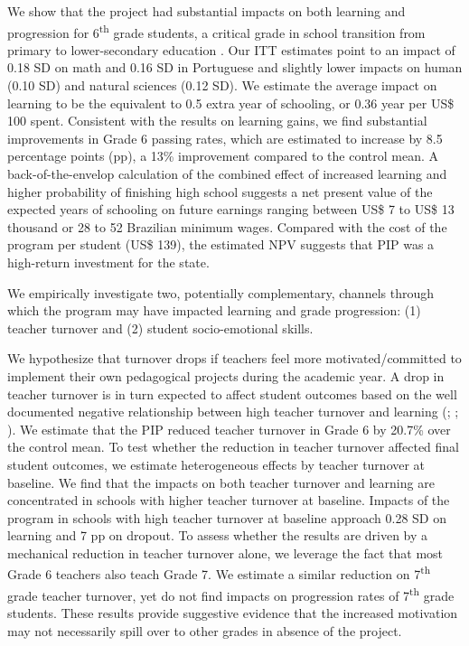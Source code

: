 \documentclass[11pt,a4paper]{article}
\begin{document}
We show that the project had substantial impacts on both learning and progression for 6\textsuperscript{th} grade students, a critical grade in school transition from primary to lower-secondary education \citep{Santos2017}. Our ITT estimates point to an impact of 0.18 SD on math and 0.16 SD in Portuguese and slightly lower impacts on human (0.10 SD) and natural sciences (0.12 SD). We estimate the average impact on learning to be the equivalent to 0.5 extra year of schooling, or 0.36 year per US\$ 100 spent. Consistent with the results on learning gains, we find substantial improvements in Grade 6 passing rates, which are estimated to increase by 8.5 percentage points (pp), a 13\% improvement compared to the control mean. A back-of-the-envelop calculation of the combined effect of increased learning and higher probability of finishing high school suggests a net present value of the expected years of schooling on future earnings ranging between US\$ 7 to US\$ 13 thousand or 28 to 52 Brazilian minimum wages. Compared with the cost of the program per student (US\$ 139), the estimated NPV suggests that PIP was a high-return investment for the state.


We empirically investigate two, potentially complementary, channels through which the program may have impacted learning and grade progression: (1) teacher turnover and (2) student socio-emotional skills. 


We hypothesize that turnover drops if teachers feel more motivated/committed to implement their own pedagogical projects during the academic year. A drop in teacher turnover is in turn expected to affect student outcomes based on the well documented negative relationship between high teacher turnover and learning (\citealp{akhtari2018political}; \citealp{ronfeldt2013teacher}; \citealp{jackson2014teacher}). We estimate that the PIP reduced teacher turnover in Grade 6 by 20.7\% over the control mean. To test whether the reduction in teacher turnover affected final student outcomes, we estimate heterogeneous effects by teacher turnover at baseline. We find that the impacts on both teacher turnover and learning are concentrated in schools with higher teacher turnover at baseline. Impacts of the program in schools with high teacher turnover at baseline approach 0.28 SD on learning and 7 pp on dropout. To assess whether the results are driven by a mechanical reduction in teacher turnover alone, we leverage the fact that most Grade 6 teachers also teach Grade 7. We estimate a similar reduction on 7\textsuperscript{th} grade teacher turnover, yet do not find impacts on progression rates of 7\textsuperscript{th} grade students. These results provide suggestive evidence that the increased motivation may not necessarily spill over to other grades in absence of the project.
\end{document}
